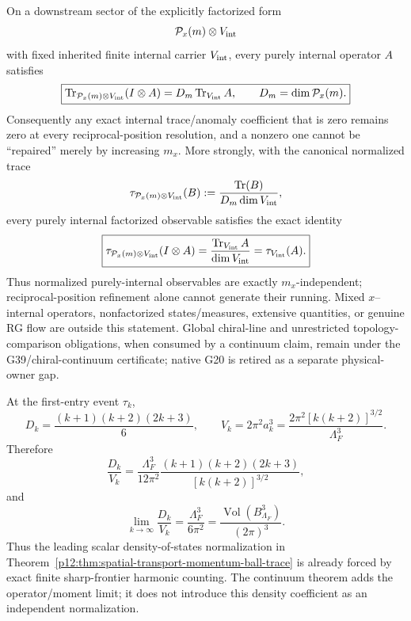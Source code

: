 \documentclass[12pt,a4paper]{article}
\begin{document}
\begin{corollary}
\label{p12:cor:v260-internal-trace-resolution-stability}
On a downstream sector of the explicitly factorized form
\[
 \mathcal P_x(m)\otimes V_{\rm int}
\]
with fixed inherited finite internal carrier $V_{\rm int}$, every purely
internal operator $A$ satisfies
\[
 \boxed{
 \operatorname{Tr}_{\mathcal P_x(m)\otimes V_{\rm int}}(I\otimes A)
 =D_m\operatorname{Tr}_{V_{\rm int}}A,
 \qquad
 D_m=\dim\mathcal P_x(m).}
\]
Consequently any exact internal trace/anomaly coefficient that is zero remains
zero at every reciprocal-position resolution, and a nonzero one cannot be
``repaired'' merely by increasing $m_x$.  More strongly, with the canonical
normalized trace
\[
 \tau_{\mathcal P_x(m)\otimes V_{\rm int}}(B)
 :=\frac{\operatorname{Tr}(B)}{D_m\dim V_{\rm int}},
\]
every purely internal factorized observable satisfies the exact identity
\[
 \boxed{
 \tau_{\mathcal P_x(m)\otimes V_{\rm int}}(I\otimes A)
 =\frac{\operatorname{Tr}_{V_{\rm int}}A}{\dim V_{\rm int}}
 =\tau_{V_{\rm int}}(A).}
\]
Thus normalized purely-internal observables are exactly $m_x$-independent;
reciprocal-position refinement alone cannot generate their running.  Mixed
$x$--internal operators, nonfactorized states/measures, extensive quantities,
or genuine RG flow are outside this statement.  Global chiral-line and unrestricted topology-comparison obligations, when consumed by a continuum claim, remain under the G39/chiral-continuum certificate; native G20 is retired as a separate physical-owner gap.
\end{corollary}

\begin{theorem}
\label{p12:thm:v260-frontier-count-weyl-density}
At the first-entry event $\tau_k$,
\[
 D_k=\frac{(k+1)(k+2)(2k+3)}6,
 \qquad
 V_k=2\pi^2a_k^3
 =\frac{2\pi^2[k(k+2)]^{3/2}}{\Lambda_F^3}.
\]
Therefore
\[
 \boxed{
 \frac{D_k}{V_k}
 =\frac{\Lambda_F^3}{12\pi^2}
 \frac{(k+1)(k+2)(2k+3)}{[k(k+2)]^{3/2}},}
\]
and
\[
 \boxed{
 \lim_{k\to\infty}\frac{D_k}{V_k}
 =\frac{\Lambda_F^3}{6\pi^2}
 =\frac{\operatorname{Vol}(B^3_{\Lambda_F})}{(2\pi)^3}.}
\]
Thus the leading scalar density-of-states normalization in
Theorem~\ref{p12:thm:spatial-transport-momentum-ball-trace} is already forced
by exact finite sharp-frontier harmonic counting.  The continuum theorem adds
the operator/moment limit; it does not introduce this density coefficient as
an independent normalization.
\end{theorem}
\end{document}
